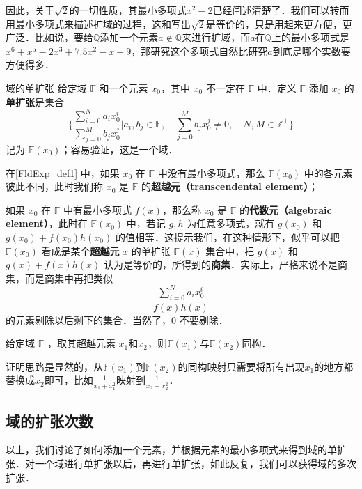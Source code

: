 因此，关于$\sqrt{2}$的一切性质，其最小多项式$x^2-2$已经阐述清楚了．我们可以转而用最小多项式来描述扩域的过程，这和写出$\sqrt{2}$是等价的，只是用起来更方便，更广泛．比如说，要给$\mathbb{Q}$添加一个元素$a\not\in \mathbb{Q}$来进行扩域，而$a$在$\mathbb{Q}$上的最小多项式是$x^6+x^5-2x^3+7.5x^2-x+9$，那研究这个多项式自然比研究$a$到底是哪个实数要方便得多．


\begin{definition}{域的单扩张}\label{FldExp_def1}
给定域 $\mathbb{F}$ 和一个元素 $x_0$，其中 $x_0$ 不一定在 $\mathbb{F}$ 中．定义 $\mathbb{F}$ 添加 $x_0$ 的\textbf{单扩张}是集合
\begin{equation}
\{\frac{\sum_{i=0}^N a_ix_0^i}{\sum_{j=0}^M b_jx_0^j}|a_i, b_j\in\mathbb{F},\quad\sum_{j=0}^M b_jx_0^j\not=0,\quad N, M\in\mathbb{Z}^+\}
\end{equation}
记为 $\mathbb{F}(x_0)$；容易验证，这是一个域．
\end{definition}

在\autoref{FldExp_def1} 中，如果 $x_0$ 在 $\mathbb{F}$ 中没有最小多项式，那么 $\mathbb{F}(x_0)$ 中的各元素彼此不同，此时我们称 $x_0$ 是 $\mathbb{F}$ 的\textbf{超越元（transcendental element）}； 

如果 $x_0$ 在 $\mathbb{F}$ 中有最小多项式 $f(x)$，那么称 $x_0$ 是 $\mathbb{F}$ 的\textbf{代数元（algebraic element）}，此时在 $\mathbb{F}(x_0)$ 中，若记 $g, h$ 为任意多项式，就有 $g(x_0)$ 和 $g(x_0)+f(x_0)h(x_0)$ 的值相等．这提示我们，在这种情形下，似乎可以把 $\mathbb{F}(x_0)$ 看成是某个\textbf{超越元} $x$ 的单扩张 $\mathbb{F}(x)$ 集合中，把 $g(x)$ 和 $g(x)+f(x)h(x)$ 认为是等价的，所得到的\textbf{商集}．实际上，严格来说不是商集，而是商集中再把类似$$\frac{\sum_{i=0}^N a_ix_0^i}{f(x)h(x)}$$的元素剔除以后剩下的集合．当然了，$0$ 不要剔除．

\begin{theorem}{}
给定域 $\mathbb{F}$ ，取其超越元素 $x_1$和$x_2$，则$\mathbb{F}(x_1)$与$\mathbb{F}(x_2)$同构．
\end{theorem}

证明思路是显然的，从$\mathbb{F}(x_1)$到$\mathbb{F}(x_2)$的同构映射只需要将所有出现$x_1$的地方都替换成$x_2$即可，比如$\frac{1}{x_1+x_1^2}$映射到$\frac{1}{x_2+x_2^2}$．



\subsection{域的扩张次数}

以上，我们讨论了如何添加一个元素，并根据元素的最小多项式来得到域的单扩张．对一个域进行单扩张以后，再进行单扩张，如此反复，我们可以获得域的多次扩张．

